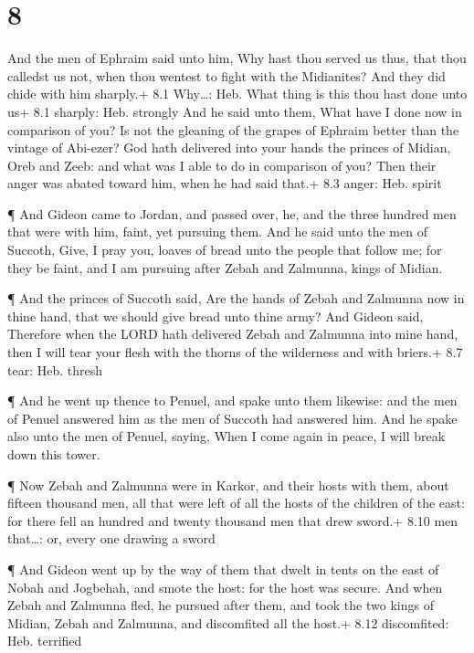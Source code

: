 \hypertarget{section-7}{%
\section{8}\label{section-7}}

 And the men of Ephraim said unto him, Why hast thou served
us thus, that thou calledst us not, when thou wentest to fight with the
Midianites? And they did chide with him sharply.+ 8.1 Why\ldots: Heb.
What thing is this thou hast done unto us+ 8.1 sharply: Heb. strongly
 And he said unto them, What have I done now in comparison
of you? Is not the gleaning of the grapes of Ephraim better than the
vintage of Abi-ezer?  God hath delivered into your hands the
princes of Midian, Oreb and Zeeb: and what was I able to do in
comparison of you? Then their anger was abated toward him, when he had
said that.+ 8.3 anger: Heb. spirit

 ¶ And Gideon came to Jordan, and passed over, he, and the
three hundred men that were with him, faint, yet pursuing them.
 And he said unto the men of Succoth, Give, I pray you,
loaves of bread unto the people that follow me; for they be faint, and I
am pursuing after Zebah and Zalmunna, kings of Midian.

 ¶ And the princes of Succoth said, Are the hands of Zebah
and Zalmunna now in thine hand, that we should give bread unto thine
army?  And Gideon said, Therefore when the LORD hath
delivered Zebah and Zalmunna into mine hand, then I will tear your flesh
with the thorns of the wilderness and with briers.+ 8.7 tear: Heb.
thresh

 ¶ And he went up thence to Penuel, and spake unto them
likewise: and the men of Penuel answered him as the men of Succoth had
answered him.  And he spake also unto the men of Penuel,
saying, When I come again in peace, I will break down this tower.

 ¶ Now Zebah and Zalmunna were in Karkor, and their hosts
with them, about fifteen thousand men, all that were left of all the
hosts of the children of the east: for there fell an hundred and twenty
thousand men that drew sword.+ 8.10 men that\ldots: or, every one
drawing a sword

 ¶ And Gideon went up by the way of them that dwelt in
tents on the east of Nobah and Jogbehah, and smote the host: for the
host was secure.  And when Zebah and Zalmunna fled, he
pursued after them, and took the two kings of Midian, Zebah and
Zalmunna, and discomfited all the host.+ 8.12 discomfited: Heb.
terrified

